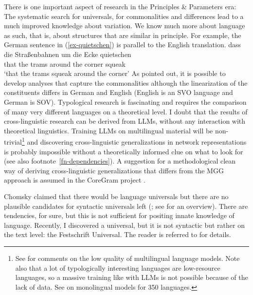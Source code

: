 There is one important aspect of research in the Principles \& Parameters era: The systematic search for
universals, for commonalities and differences lead to a much improved knowledge about variation. We
know much more about language as such, that is, about structures that are similar in principle.
For example, the German sentence in (\ref{ex-quietschen}) is parallel to the English translation. 
\ea
\label{ex-quietschen} 
\gll dass die Straßenbahnen um die Ecke quietschen\\
     that the trams         around the corner squeak\\
\glt `that the trams squeak around the corner'
\z
As \citet{MuellerUnifying} pointed out, it is possible to develop analyses that capture the
commonalities although the linearization of the constituents differs in German and English (English
is an SVO language and German is SOV). 
Typological research is fascinating and requires the comparison of many very different languages on a
theoretical level. I doubt that the results of cross-linguistic research can be derived from LLMs,
without any interaction with theoretical linguistics. Training LLMs on multilingual material will be
non-trivial\footnote{
  See \citet{ChangArnettTu2024a} for comments on the low quality of multilingual language
  models. Note also that a lot of typologically interesting languages are low-resource languages, so
  a massive training like with LLMs is not possible because of the lack of data. See
  \citet{ChangArnettTu2024a} on monolingual models for 350 languages.
} and discovering cross-linguistic generalizations in network representations is probably
impossible without a theoretically informed clue on what to look for (see also footnote~\ref{fn-dependencies}). A suggestion for a
methodological clean way of deriving cross-linguistic generalizations that differs from the MGG
approach is assumed in the CoreGram project \citep{MuellerCoreGram}.

Chomsky claimed that there would be language universals but there are no plausible candidates for
syntactic universals left (\citealt{EL2009a}; see \citealt[Section~13.1]{MuellerGT-Eng5} for an overview). There are tendencies, for sure, but this is not sufficient for positing
innate knowledge of language. Recently, I discovered a universal, but it is not syntactic but rather
on the text level: the Festschrift Universal. The reader is referred to 
for details.

